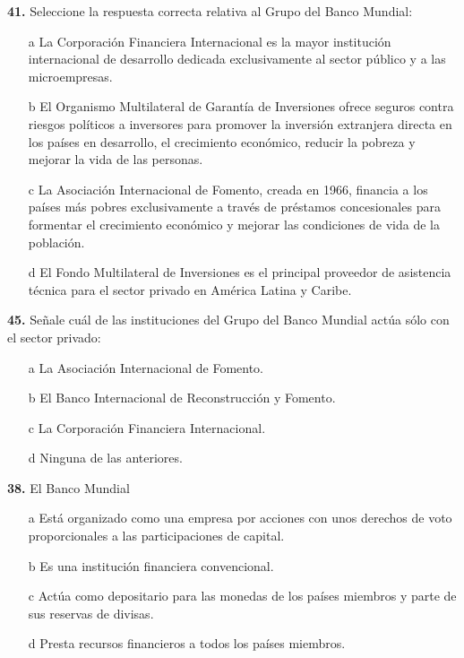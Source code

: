\documentclass{nuevotema}
\begin{document}

\textbf{41.} Seleccione la respuesta correcta relativa al Grupo del Banco Mundial:

\begin{itemize}
	\item[a] La Corporación Financiera Internacional es la mayor institución internacional de desarrollo dedicada exclusivamente al sector público y a las microempresas.
	\item[b] El Organismo Multilateral de Garantía de Inversiones ofrece seguros contra riesgos políticos a inversores para promover la inversión extranjera directa en los países en desarrollo, el crecimiento económico, reducir la pobreza y mejorar la vida de las personas.
	\item[c] La Asociación Internacional de Fomento, creada en 1966, financia a los países más pobres exclusivamente a través de préstamos concesionales para formentar el crecimiento económico y mejorar las condiciones de vida de la población.
	\item[d] El Fondo Multilateral de Inversiones es el principal proveedor de asistencia técnica para el sector privado en América Latina y Caribe.
\end{itemize}


\textbf{45.} Señale cuál de las instituciones del Grupo del Banco Mundial actúa sólo con el sector privado:

\begin{itemize}
	\item[a] La Asociación Internacional de Fomento.
	\item[b] El Banco Internacional de Reconstrucción y Fomento.
	\item[c] La Corporación Financiera Internacional.
	\item[d] Ninguna de las anteriores.
\end{itemize}


\textbf{38.} El Banco Mundial

\begin{itemize}
	\item[a] Está organizado como una empresa por acciones con unos derechos de voto proporcionales a las participaciones de capital.
	\item[b] Es una institución financiera convencional.
	\item[c] Actúa como depositario para las monedas de los países miembros y parte de sus reservas de divisas.
	\item[d] Presta recursos financieros a todos los países miembros.
\end{itemize}
\end{document}
